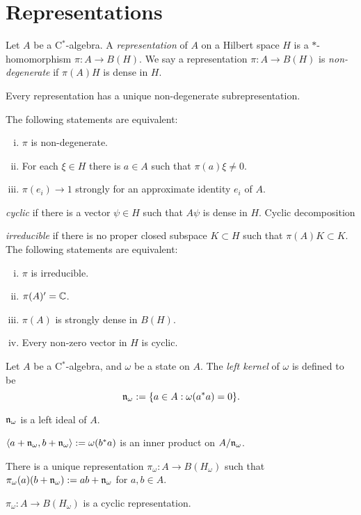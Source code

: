 \documentclass{../../large}
\begin{document}
\section{Representations}


\begin{prb}
Let $A$ be a C$^*$-algebra.
A \emph{representation} of $A$ on a Hilbert space $H$ is a $*$-homomorphism $\pi:A\to B(H)$.
We say a representation $\pi:A\to B(H)$ is \emph{non-degenerate} if $\pi(A)H$ is dense in $H$.
\begin{parts}
\item Every representation has a unique non-degenerate subrepresentation.
\item The following statements are equivalent:
\begin{enumerate}[(i)]
\item $\pi$ is non-degenerate.
\item For each $\xi\in H$ there is $a\in A$ such that $\pi(a)\xi\ne0$.
\item $\pi(e_i)\to1$ strongly for an approximate identity $e_i$ of $A$.
\end{enumerate}
\end{parts}
\end{prb}

\begin{prb}
\emph{cyclic} if there is a vector $\psi\in H$ such that $A\psi$ is dense in $H$.
Cyclic decomposition
\end{prb}


\begin{prb}
\emph{irreducible} if there is no proper closed subspace $K\subset H$ such that $\pi(A)K\subset K$.
The following statements are equivalent:
\begin{enumerate}[(i)]
\item $\pi$ is irreducible.
\item $\pi(A)'=\mathbb{C}$.
\item $\pi(A)$ is strongly dense in $B(H)$.
\item Every non-zero vector in $H$ is cyclic.
\end{enumerate}
\end{prb}


\begin{prb}
Let $A$ be a C$^*$-algebra, and $\omega$ be a state on $A$.
The \emph{left kernel} of $\omega$ is defined to be
\[\mathfrak{n}_\omega:=\{a\in A:\omega(a^*a)=0\}.\]
\begin{parts}
\item $\mathfrak{n}_\omega$ is a left ideal of $A$.
\item $\langle a+\mathfrak{n}_\omega,b+\mathfrak{n}_\omega\rangle:=\omega(b^*a)$ is an inner product on $A/\mathfrak{n}_\omega$.
\item There is a unique representation $\pi_\omega:A\to B(H_\omega)$ such that $\pi_\omega(a)(b+\mathfrak{n}_\omega):=ab+\mathfrak{n}_\omega$ for $a,b\in A$.
\item $\pi_\omega:A\to B(H_\omega)$ is a cyclic representation.
\end{parts}
\end{prb}
\end{document}
